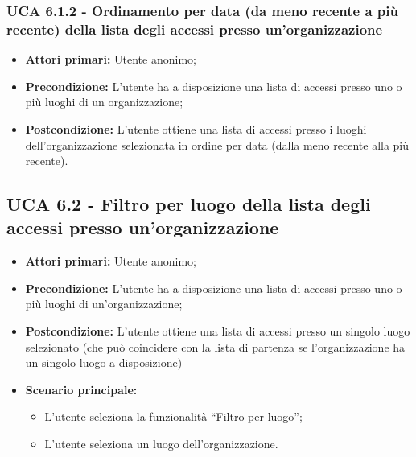 \subsubsection{UCA 6.1.2 - Ordinamento per data (da meno recente a più recente) della lista degli accessi presso un’organizzazione}%
\begin{itemize}
	\item \textbf{Attori primari:} Utente anonimo;
	\item \textbf{Precondizione:} L’utente ha a disposizione una lista di accessi presso uno o più luoghi di un organizzazione;	
	\item \textbf{Postcondizione:} L’utente ottiene una lista di accessi presso i luoghi dell’organizzazione selezionata in ordine per data (dalla meno recente alla più recente).	
\end{itemize}

\subsection{UCA 6.2 - Filtro per luogo della lista degli accessi presso un’organizzazione}%
\begin{itemize}
	\item \textbf{Attori primari:} Utente anonimo;
	\item \textbf{Precondizione:} L’utente ha a disposizione una lista di accessi presso uno o più luoghi di un'organizzazione;
	\item \textbf{Postcondizione:} L’utente ottiene una lista di accessi presso un singolo luogo selezionato (che può coincidere con la lista di partenza se l’organizzazione ha un singolo luogo a disposizione)	
	\item \textbf{Scenario principale:}
	\begin{itemize}
		\item L’utente seleziona la funzionalità “Filtro per luogo”;
		\item L’utente seleziona un luogo dell’organizzazione.
	\end{itemize}
\end{itemize}